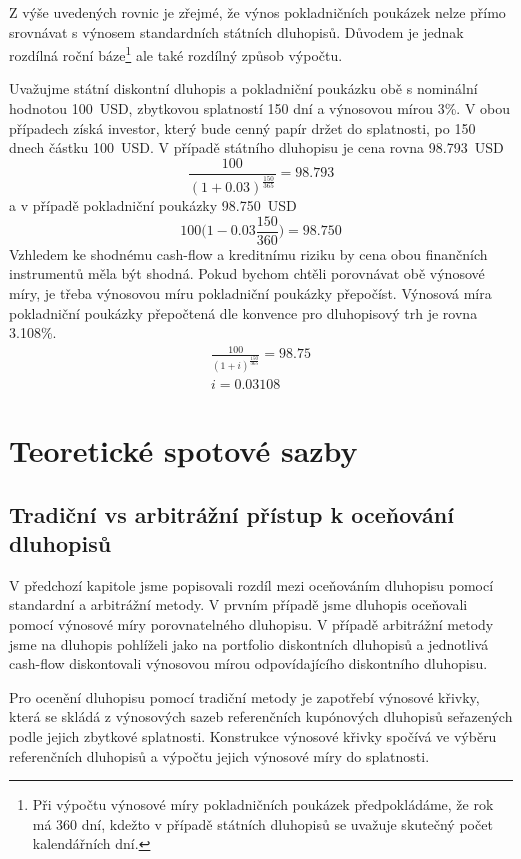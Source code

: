 \documentclass[a4paper]{book}
\begin{document}
Z výše uvedených rovnic je zřejmé, že výnos pokladničních poukázek nelze přímo srovnávat s výnosem standardních státních dluhopisů. Důvodem je jednak rozdílná roční báze\footnote{Při výpočtu výnosové míry pokladničních poukázek předpokládáme, že rok má 360 dní, kdežto v případě státních dluhopisů se uvažuje skutečný počet kalendářních dní.} ale také rozdílný způsob výpočtu.

Uvažujme státní diskontní dluhopis a pokladniční poukázku obě s nominální hodnotou 100~USD, zbytkovou splatností 150 dní a výnosovou mírou 3\%. V obou případech získá investor, který bude cenný papír držet do splatnosti, po 150 dnech částku 100~USD. V případě státního dluhopisu je cena rovna 98.793~USD
\begin{equation*}
\frac{100}{(1 + 0.03)^{\frac{150}{365}}} = 98.793
\end{equation*}
a v případě pokladniční poukázky 98.750~USD
\begin{equation*}
100 \Big(1 - 0.03 \frac{150}{360}\Big) = 98.750
\end{equation*}
Vzhledem ke shodnému cash-flow a kreditnímu riziku by cena obou finančních instrumentů měla být shodná. Pokud bychom chtěli porovnávat obě výnosové míry, je třeba výnosovou míru pokladniční poukázky přepočíst. Výnosová míra pokladniční poukázky přepočtená dle konvence pro dluhopisový trh je rovna 3.108\%.
\begin{gather*}
\frac{100}{(1 + i)^\frac{150}{365}} = 98.75\\
i = 0.03108
\end{gather*}

\section{Teoretické spotové sazby}

\subsection{Tradiční vs arbitrážní přístup k oceňování dluhopisů}

V předchozí kapitole jsme popisovali rozdíl mezi oceňováním dluhopisu pomocí standardní a arbitrážní metody. V prvním případě jsme dluhopis oceňovali pomocí výnosové míry porovnatelného dluhopisu. V případě arbitrážní metody jsme na dluhopis pohlíželi jako na portfolio diskontních dluhopisů a jednotlivá cash-flow diskontovali výnosovou mírou odpovídajícího diskontního dluhopisu.

Pro ocenění dluhopisu pomocí tradiční metody je zapotřebí výnosové křivky, která se skládá z výnosových sazeb referenčních kupónových dluhopisů seřazených podle jejich zbytkové splatnosti. Konstrukce výnosové křivky spočívá ve výběru referenčních dluhopisů a výpočtu jejich výnosové míry do splatnosti.
\end{document}
